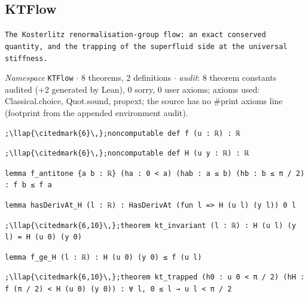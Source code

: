 \subsection{KTFlow}\label{appA:KTFlow}
{\footnotesize\raggedright\texttt{The Kosterlitz renormalisation-\allowbreak{}group flow: an exact conserved quantity,\allowbreak{} and the trapping of the superfluid side at the universal stiffness.\allowbreak{}}\par}
{\footnotesize\raggedright\emph{Namespace} \texttt{KTFlow} $\cdot$ 8 theorems, 2 definitions $\cdot$ \emph{audit}: 8 theorem constants audited (+2 generated by Lean), 0 sorry, 0 user axioms; axioms used: Classical.choice, Quot.sound, propext; the source has no \#print axioms line (footprint from the appended environment audit).\par}
\vspace{1pt}
\begin{lstlisting}[style=leancat]
;\llap{\citedmark{6}\,};noncomputable def f (u : ℝ) : ℝ
\end{lstlisting}

\begin{lstlisting}[style=leancat]
;\llap{\citedmark{6}\,};noncomputable def H (u y : ℝ) : ℝ
\end{lstlisting}

\begin{lstlisting}[style=leancat]
lemma f_antitone {a b : ℝ} (ha : 0 < a) (hab : a ≤ b) (hb : b ≤ π / 2) : f b ≤ f a
\end{lstlisting}

\begin{lstlisting}[style=leancat]
lemma hasDerivAt_H (l : ℝ) : HasDerivAt (fun l => H (u l) (y l)) 0 l
\end{lstlisting}

\begin{lstlisting}[style=leancat]
;\llap{\citedmark{6,10}\,};theorem kt_invariant (l : ℝ) : H (u l) (y l) = H (u 0) (y 0)
\end{lstlisting}

\begin{lstlisting}[style=leancat]
lemma f_ge_H (l : ℝ) : H (u 0) (y 0) ≤ f (u l)
\end{lstlisting}

\begin{lstlisting}[style=leancat]
;\llap{\citedmark{6,10}\,};theorem kt_trapped (h0 : u 0 < π / 2) (hH : f (π / 2) < H (u 0) (y 0)) : ∀ l, 0 ≤ l → u l < π / 2
\end{lstlisting}

